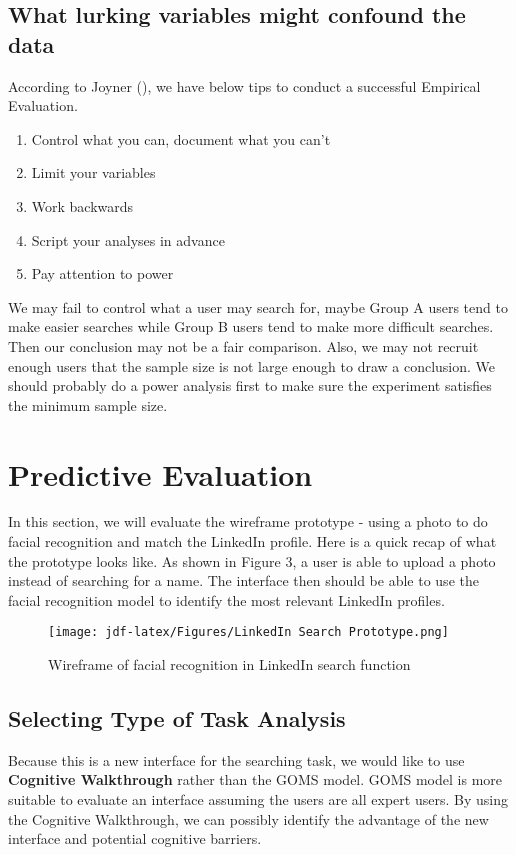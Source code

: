 \documentclass[
	letterpaper, %
]{jdf}
\begin{document}
\subsection{What lurking variables might confound the data}
According to Joyner (\cite{joyner2016c}), we have below tips to conduct a successful Empirical Evaluation.
\begin{enumerate}
    \item Control what you can, document what you can't
    \item Limit your variables
    \item Work backwards
    \item Script your analyses in advance
    \item Pay attention to power
\end{enumerate}

We may fail to control what a user may search for, maybe Group A users tend to make easier searches while Group B users tend to make more difficult searches. Then our conclusion may not be a fair comparison. Also, we may not recruit enough users that the sample size is not large enough to draw a conclusion. We should probably do a power analysis first to make sure the experiment satisfies the minimum sample size.

\section{Predictive Evaluation}
In this section, we will evaluate the wireframe prototype - using a photo to do facial recognition and match the LinkedIn profile. Here is a quick recap of what the prototype looks like. As shown in Figure 3, a user is able to upload a photo instead of searching for a name. The interface then should be able to use the facial recognition model to identify the most relevant LinkedIn profiles.
\begin{figure}[h]
	\centering
	\texttt{[image: jdf-latex/Figures/LinkedIn Search Prototype.png]}
	\caption{Wireframe of facial recognition in LinkedIn search function}
	\label{fig:wireframe}
\end{figure}

\subsection{Selecting Type of Task Analysis}
Because this is a new interface for the searching task, we would like to use \textbf{Cognitive Walkthrough} rather than the GOMS model. GOMS model is more suitable to evaluate an interface assuming the users are all expert users. By using the Cognitive Walkthrough, we can possibly identify the advantage of the new interface and potential cognitive barriers.
\end{document}
